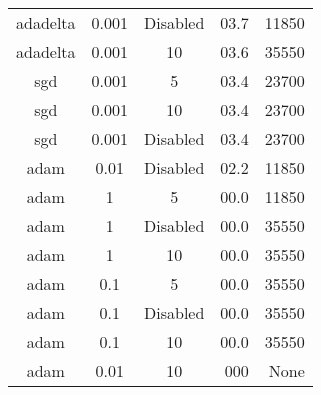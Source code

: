 \begin{table}
\begin{tabular}{|c|c|c|r|r|}
	 adadelta &     0.001     & Disabled        & 03.7 & 11850 \\
	 adadelta &     0.001     &       10        & 03.6 & 35550 \\
	   sgd    &     0.001     &        5        & 03.4 & 23700 \\
	   sgd    &     0.001     &       10        & 03.4 & 23700 \\
	   sgd    &     0.001     & Disabled        & 03.4 & 23700 \\
	   adam   &      0.01     & Disabled        & 02.2 & 11850 \\
	   adam   &       1       &        5        & 00.0 & 11850 \\
	   adam   &       1       & Disabled        & 00.0 & 35550 \\
	   adam   &       1       &       10        & 00.0 & 35550 \\
	   adam   &      0.1      &        5        & 00.0 & 35550 \\
	   adam   &      0.1      & Disabled        & 00.0 & 35550 \\
	   adam   &      0.1      &       10        & 00.0 & 35550 \\
	   adam   &      0.01     &       10        & 000 &  None \\
	\hline
\end{tabular}
\end{table}
